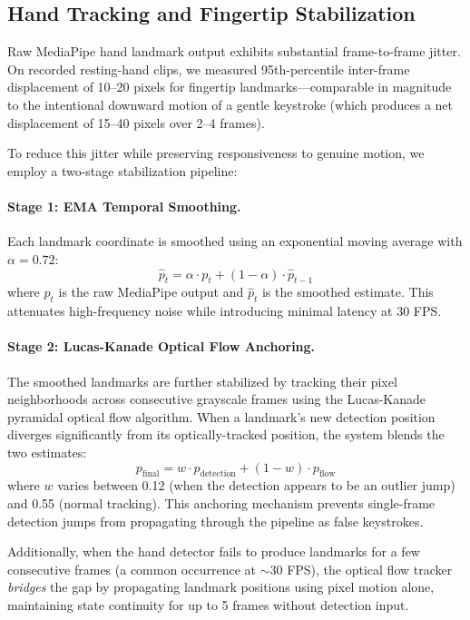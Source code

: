 \documentclass[11pt,a4paper]{article}
\begin{document}
\subsection{Hand Tracking and Fingertip Stabilization}

Raw MediaPipe hand landmark output exhibits substantial frame-to-frame jitter.
On recorded resting-hand clips, we measured 95th-percentile inter-frame displacement of 10--20 pixels for fingertip landmarks---comparable in magnitude to the intentional downward motion of a gentle keystroke (which produces a net displacement of 15--40 pixels over 2--4 frames).

To reduce this jitter while preserving responsiveness to genuine motion, we employ a two-stage stabilization pipeline:

\paragraph{Stage 1: EMA Temporal Smoothing.}
Each landmark coordinate is smoothed using an exponential moving average with $\alpha = 0.72$:
\begin{equation}
    \hat{p}_t = \alpha \cdot p_t + (1 - \alpha) \cdot \hat{p}_{t-1}
\end{equation}
where $p_t$ is the raw MediaPipe output and $\hat{p}_t$ is the smoothed estimate.
This attenuates high-frequency noise while introducing minimal latency at 30 FPS.

\paragraph{Stage 2: Lucas-Kanade Optical Flow Anchoring.}
The smoothed landmarks are further stabilized by tracking their pixel neighborhoods across consecutive grayscale frames using the Lucas-Kanade pyramidal optical flow algorithm.
When a landmark's new detection position diverges significantly from its optically-tracked position, the system blends the two estimates:
\begin{equation}
    p_{\text{final}} = w \cdot p_{\text{detection}} + (1-w) \cdot p_{\text{flow}}
\end{equation}
where $w$ varies between 0.12 (when the detection appears to be an outlier jump) and 0.55 (normal tracking).
This anchoring mechanism prevents single-frame detection jumps from propagating through the pipeline as false keystrokes.

Additionally, when the hand detector fails to produce landmarks for a few consecutive frames (a common occurrence at $\sim$30 FPS), the optical flow tracker \emph{bridges} the gap by propagating landmark positions using pixel motion alone, maintaining state continuity for up to 5 frames without detection input.
\end{document}
